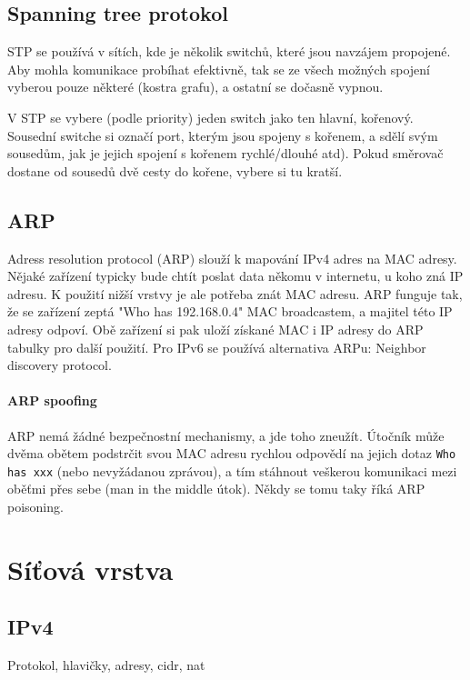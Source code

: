 \subsection{Spanning tree protokol}

STP se používá v sítích, kde je několik switchů, které jsou navzájem propojené. Aby mohla komunikace probíhat efektivně, tak se ze všech možných spojení vyberou pouze některé (kostra grafu), a ostatní se dočasně vypnou.

V STP se vybere (podle priority) jeden switch jako ten hlavní, kořenový. Sousední switche si označí port, kterým jsou spojeny s kořenem, a sdělí svým sousedům, jak je jejich spojení s kořenem rychlé/dlouhé atd). Pokud směrovač dostane od sousedů dvě cesty do kořene, vybere si tu kratší.

\subsection{ARP}

Adress resolution protocol (ARP) slouží k mapování IPv4 adres na MAC adresy. Nějaké zařízení typicky bude chtít poslat data někomu v internetu, u koho zná IP adresu. K použití nižší vrstvy je ale potřeba znát MAC adresu. ARP funguje tak, že se zařízení zeptá "Who has 192.168.0.4" MAC broadcastem, a majitel této IP adresy odpoví. Obě zařízení si pak uloží získané MAC i IP adresy do ARP tabulky pro další použití. Pro IPv6 se používá alternativa ARPu: Neighbor discovery protocol.

\paragraph{ARP spoofing} ARP nemá žádné bezpečnostní mechanismy, a jde toho zneužít. Útočník může dvěma obětem podstrčit svou MAC adresu rychlou odpovědí na jejich dotaz \texttt{Who has xxx} (nebo nevyžádanou zprávou), a tím stáhnout veškerou komunikaci mezi oběťmi přes sebe (man in the middle útok). Někdy se tomu taky říká ARP poisoning.



\section{Síťová vrstva}

\subsection{IPv4}
Protokol, hlavičky, adresy, cidr, nat

